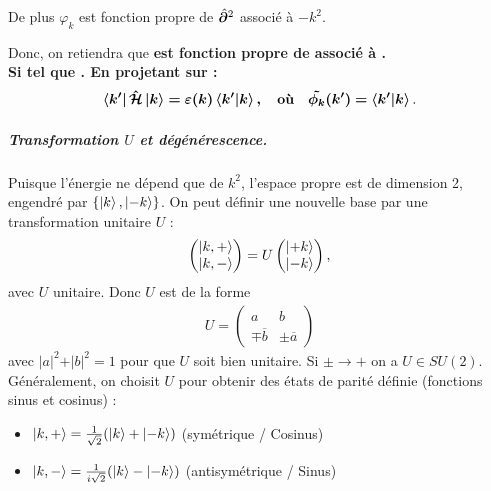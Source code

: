 De plus $\varphi_{k}$ est fonction propre de $\hat{\bm{\partial}}^2$ associé à $-k^2$.\\

\smallskip

Donc, on retiendra que {\bf  {} est fonction propre de  associé à .\\

Si  tel que . En projetant sur  :
\begin{eqnarray}
    \bm{\bra{k'} \hat{\bm{\mathcal H}} \ket{k} = \varepsilon(k) \braket{k'\vert k}, \quad \mbox{où} \quad  \tilde{\phi_k}(k') =  \braket{k'\vert k}}.
\end{eqnarray}
}



\subparagraph{Transformation $U$ et dégénérescence.}

Puisque l'énergie ne dépend que de $k^2$, l'espace propre est de dimension 2, engendré par $\{ \ket{k}, \ket{-k} \}$. On peut définir une nouvelle base par une transformation unitaire $U$ :
\begin{eqnarray}
    \begin{pmatrix} \ket{k, +} \\ \ket{k, -} \end{pmatrix} = U \begin{pmatrix} \ket{+k} \\ \ket{-k} \end{pmatrix},
\end{eqnarray}
avec $U$ unitaire. Donc $U$ est de la forme 
\begin{eqnarray}
    U = \begin{pmatrix} a & b  \\ \mp \overline{b} & \pm \overline{a} \end{pmatrix}
\end{eqnarray}
avec $\vert a \vert^2 + \vert b \vert^2 = 1 $ pour que $U$ soit bien unitaire. Si $\pm \rightarrow +$ on a $U \in SU(2)$.
Généralement, on choisit $U$ pour obtenir des états de parité définie (fonctions sinus et cosinus) :
\begin{itemize}[label = $\bullet$]
    \item $\ket{k, +} = \frac{1}{\sqrt{2}} (\ket{k} + \ket{-k})$ (symétrique / Cosinus)
    \item $\ket{k, -} = \frac{1}{i\sqrt{2}} (\ket{k} - \ket{-k})$ (antisymétrique / Sinus) 
\end{itemize}

